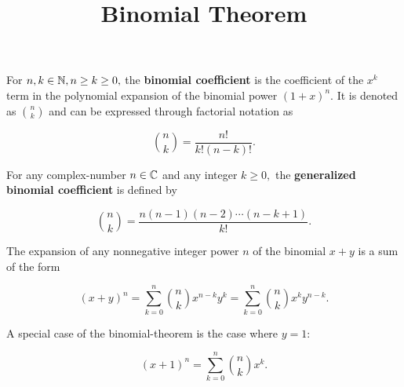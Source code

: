 \documentclass{article}
\title{Binomial Theorem}
\begin{document}
\begin{definition}
For $n, k \in \mathbb{N}, n \geq k \geq 0,$ the \textbf{binomial coefficient} is the coefficient of the $x^k$ term in the polynomial expansion of the binomial power $(1+x)^n.$ It is denoted as $\binom{n}{k}$ and can be expressed through \@{factorial} notation as

\[ \binom{n}{k} = \frac{n!}{k!(n - k)!}. \]
\end{definition}

\begin{definition}
For any \@{complex-number} $n \in \mathbb{C}$ and any \@{integer} $k \geq 0,$ the \textbf{generalized binomial coefficient} is defined by

\[ \binom{n}{k} = \frac{n(n-1)(n-2) \cdots (n - k + 1)}{k!}. \]
\end{definition}

\begin{theorem}\label{binomial-theorem}
The expansion of any nonnegative integer power $n$ of the \@{binomial} $x+y$ is a sum of the form

\[ (x+y)^n = \sum_{k=0}^n \binom{n}{k} x^{n-k} y^k = \sum_{k=0}^n \binom{n}{k} x^k y^{n-k}. \]
\end{theorem}

\detach

\begin{remark}
A special case of the \@{binomial-theorem} is the case where $y = 1:$

\[ (x+1)^n = \sum_{k=0}^n \binom{n}{k} x^k. \]
\end{remark}
\end{document}
